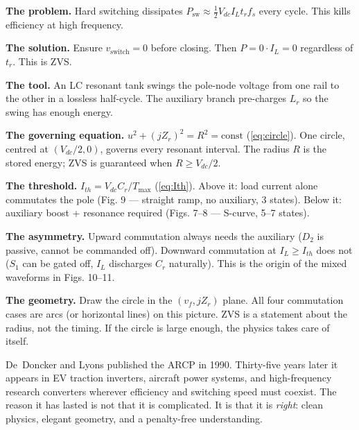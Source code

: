 \documentclass[12pt, a4paper]{article}
\def\,{ }%
\newcommand{\Vdc}{V_{dc}}
\newcommand{\IL}{I_L}
\newcommand{\Lr}{L_r}
\newcommand{\Cr}{C_r}
\newcommand{\Zr}{Z_r}
\newcommand{\Ith}{I_{th}}
\begin{document}
\begin{physbox}
\textbf{The problem.}
Hard switching dissipates $P_\text{sw} \approx \frac{1}{2}\Vdc\,\IL\,t_r\,f_s$
every cycle.
This kills efficiency at high frequency.

\medskip\noindent
\textbf{The solution.}
Ensure $v_\text{switch} = 0$ before closing.
Then $P = 0 \cdot \IL = 0$ regardless of $t_r$.
This is ZVS.

\medskip\noindent
\textbf{The tool.}
An LC resonant tank swings the pole-node voltage from one rail to the other
in a lossless half-cycle.
The auxiliary branch pre-charges $\Lr$ so the swing has enough energy.

\medskip\noindent
\textbf{The governing equation.}
$u^2 + (j\Zr)^2 = R^2 = \text{const}$
(\eqref{eq:circle}).
One circle, centred at $(\Vdc/2, 0)$, governs every resonant interval.
The radius $R$ is the stored energy; ZVS is guaranteed when $R \geq \Vdc/2$.

\medskip\noindent
\textbf{The threshold.}
$\Ith = \Vdc\Cr/T_\text{max}$ (\eqref{eq:Ith}).
Above it: load current alone commutates the pole (Fig.\,9 --- straight ramp,
no auxiliary, 3 states).
Below it: auxiliary boost + resonance required (Figs.\,7--8 --- S-curve,
5--7 states).

\medskip\noindent
\textbf{The asymmetry.}
Upward commutation always needs the auxiliary ($D_2$ is passive, cannot be
commanded off).
Downward commutation at $\IL \geq \Ith$ does not ($S_1$ can be gated off,
$\IL$ discharges $C_r$ naturally).
This is the origin of the mixed waveforms in Figs.\,10--11.

\medskip\noindent
\textbf{The geometry.}
Draw the circle in the $(v_f, j\Zr)$ plane.
All four commutation cases are arcs (or horizontal lines) on this picture.
ZVS is a statement about the radius, not the timing.
If the circle is large enough, the physics takes care of itself.
\end{physbox}

\noindent
De~Doncker and Lyons published the ARCP in 1990.
Thirty-five years later it appears in EV traction inverters, aircraft power
systems, and high-frequency research converters wherever efficiency and
switching speed must coexist.
The reason it has lasted is not that it is complicated.
It is that it is \emph{right}: clean physics, elegant geometry, and a
penalty-free understanding.

\appendix
\end{document}
